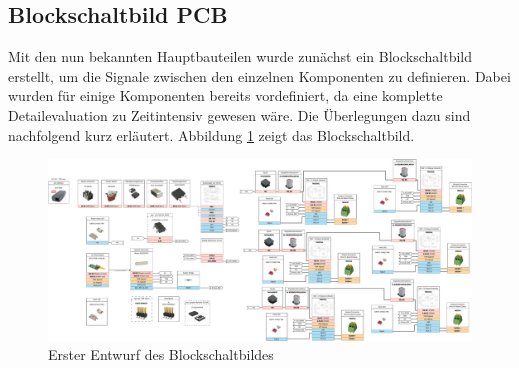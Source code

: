 \subsection{Blockschaltbild PCB}
Mit den nun bekannten Hauptbauteilen wurde zunächst ein Blockschaltbild erstellt, um die Signale zwischen den einzelnen Komponenten zu definieren. Dabei wurden für einige Komponenten bereits vordefiniert, da eine komplette Detailevaluation zu Zeitintensiv gewesen wäre. Die Überlegungen dazu sind nachfolgend kurz erläutert. Abbildung \ref{pic:blockschaltbild_pcb} zeigt das Blockschaltbild. 
\newpage
\begin{figure}[H]
	\centering
	\includegraphics[width=\textheight - 1cm, angle=90]{pictures/blockschaltbild_pcb.pdf}
	\caption{Erster Entwurf des Blockschaltbildes}
	\label{pic:blockschaltbild_pcb}
\end{figure}